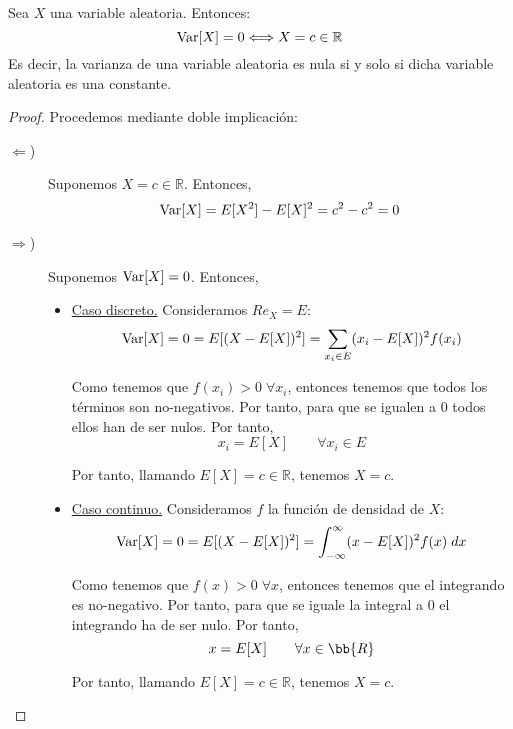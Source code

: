 \begin{prop}\label{prop:6.13}
    Sea $X$ una variable aleatoria. Entonces:
    \begin{equation*}
        \operatorname{Var}[X]=0 \Longleftrightarrow X=c\in \mathbb{R}
    \end{equation*}
    Es decir, la varianza de una variable aleatoria es nula si y solo si dicha variable aleatoria es una constante.
\end{prop}
\begin{proof}
    Procedemos mediante doble implicación:
    \begin{description}
        \item [$\Longleftarrow$)] Suponemos $X=c\in \mathbb{R}$. Entonces,
        \begin{equation*}
            \operatorname{Var}[X] = E[X^2]-E[X]^2 = c^2 -c^2 = 0
        \end{equation*}

        \item [$\Longrightarrow$)] Suponemos $\operatorname{Var}[X]=0$. Entonces,
        \begin{itemize}
            \item \underline{Caso discreto.} Consideramos $Re_X = E$:
            \begin{equation*}
                \operatorname{Var}[X] = 0 = E[(X-E[X])^2]
                = \sum_{x_i\in E}(x_i-E[X])^2 f(x_i)
            \end{equation*}

            Como tenemos que $f(x_i)> 0\;\forall x_i$, entonces tenemos que todos los términos son no-negativos. Por tanto, para que se igualen a $0$ todos ellos han de ser nulos. Por tanto,
            \begin{equation*}
                x_i = E[X] \qquad \forall x_i \in E
            \end{equation*}

            Por tanto, llamando $E[X]=c\in \mathbb{R}$, tenemos $X=c$.



            \item \underline{Caso continuo.} Consideramos $f$ la función de densidad de $X$:
            \begin{equation*}
                \operatorname{Var}[X] = 0 = E[(X-E[X])^2]
                = \int_{-\infty}^\infty (x-E[X])^2 f(x)\;dx
            \end{equation*}

            Como tenemos que $f(x)> 0\;\forall x$, entonces tenemos que el integrando es no-negativo. Por tanto, para que se iguale la integral a $0$ el integrando ha de ser nulo. Por tanto,
            \begin{equation*}
                x = E[X] \qquad \forall x \in \bb{R}
            \end{equation*}

            Por tanto, llamando $E[X]=c\in \mathbb{R}$, tenemos $X=c$.
        \end{itemize}
    \end{description}
\end{proof}

